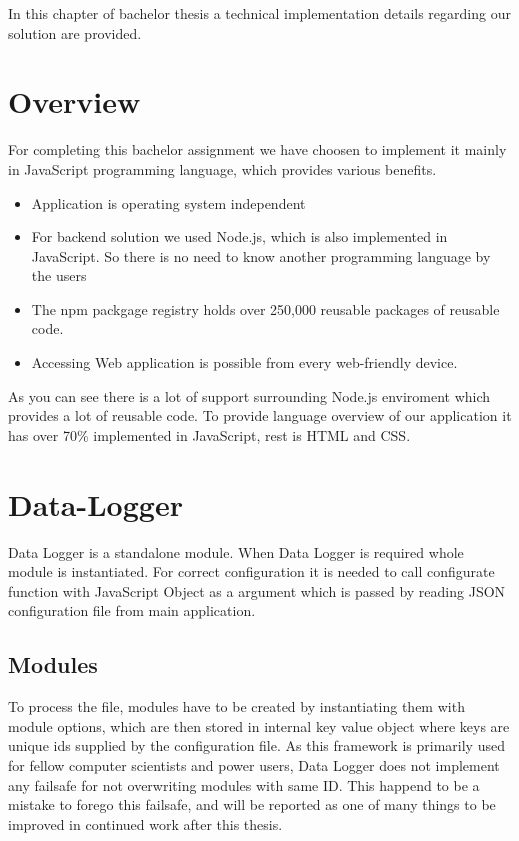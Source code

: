 In this chapter of bachelor thesis a technical implementation details regarding our solution are provided.
\section{Overview} %
\label{sec:overview}
For completing this bachelor assignment we have choosen to implement it mainly in JavaScript programming language, which provides various benefits.
\begin{itemize}
\item Application is operating system independent
\item For backend solution we used Node.js, which is also implemented in JavaScript. So there is no need to know another programming language by the users
\item The npm packgage registry holds over 250,000 reusable packages of reusable code.
\item Accessing Web application is possible from every web-friendly device.
\end{itemize}
As you can see there is a lot of support surrounding Node.js enviroment which provides a lot of reusable code. To provide language overview of our application it has over 70\% implemented in JavaScript, rest is HTML and CSS.
\section{Data-Logger} %
\label{sec:data_logger}
Data Logger is a standalone module. When Data Logger is required whole module is instantiated. For correct configuration it is needed to call configurate function with JavaScript Object as a argument which is passed by reading JSON configuration file from main application.
\subsection{Modules} %
\label{sub:modules}
To process the file, modules have to be created by instantiating them with module options, which are then stored in internal key value object where keys are unique ids supplied by the configuration file. As this framework is primarily used for fellow computer scientists and power users, Data Logger does not implement any failsafe for not overwriting modules with same ID. This happend to be a mistake to forego this failsafe, and will be reported as one of many things to be improved in continued work after this thesis.
